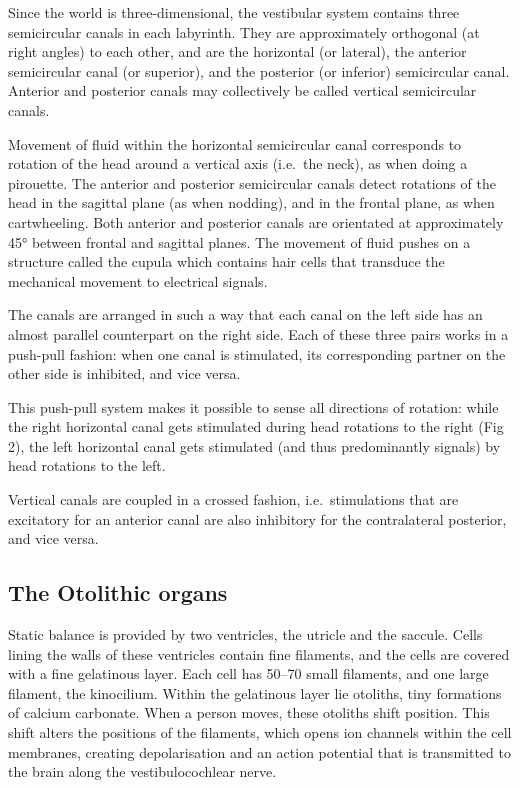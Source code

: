 \documentclass[]{book}
\begin{document}
Since the world is three-dimensional, the vestibular system contains three semicircular canals in each labyrinth. They are approximately orthogonal (at right angles) to each other, and are the horizontal (or lateral), the anterior semicircular canal (or superior), and the posterior (or inferior) semicircular canal. Anterior and posterior canals may collectively be called vertical semicircular canals.

Movement of fluid within the horizontal semicircular canal corresponds to rotation of the head around a vertical axis (i.e.~the neck), as when doing a pirouette.
The anterior and posterior semicircular canals detect rotations of the head in the sagittal plane (as when nodding), and in the frontal plane, as when cartwheeling. Both anterior and posterior canals are orientated at approximately 45° between frontal and sagittal planes.
The movement of fluid pushes on a structure called the cupula which contains hair cells that transduce the mechanical movement to electrical signals.

The canals are arranged in such a way that each canal on the left side has an almost parallel counterpart on the right side. Each of these three pairs works in a push-pull fashion: when one canal is stimulated, its corresponding partner on the other side is inhibited, and vice versa.

This push-pull system makes it possible to sense all directions of rotation: while the right horizontal canal gets stimulated during head rotations to the right (Fig 2), the left horizontal canal gets stimulated (and thus predominantly signals) by head rotations to the left.

Vertical canals are coupled in a crossed fashion, i.e.~stimulations that are excitatory for an anterior canal are also inhibitory for the contralateral posterior, and vice versa.

\hypertarget{the-otolithic-organs}{%
\subsection{The Otolithic organs}\label{the-otolithic-organs}}

Static balance is provided by two ventricles, the utricle and the saccule. Cells lining the walls of these ventricles contain fine filaments, and the cells are covered with a fine gelatinous layer. Each cell has 50--70 small filaments, and one large filament, the kinocilium. Within the gelatinous layer lie otoliths, tiny formations of calcium carbonate. When a person moves, these otoliths shift position. This shift alters the positions of the filaments, which opens ion channels within the cell membranes, creating depolarisation and an action potential that is transmitted to the brain along the vestibulocochlear nerve.
\end{document}
